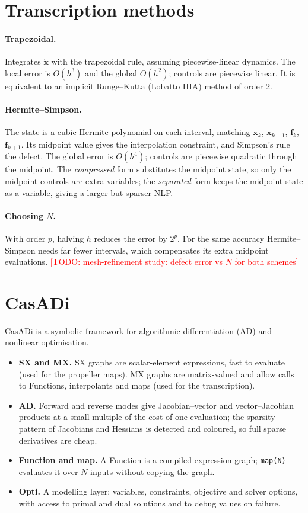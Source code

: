 \documentclass[11pt,a4paper]{article}
\newcommand{\todo}[1]{\textcolor{red}{[TODO: #1]}}
\newcommand{\code}[1]{\texttt{\small #1}}
\begin{document}
\section{Transcription methods}\label{app:transcription}
\paragraph{Trapezoidal.} Integrates $\dot{\mathbf{x}}$ with the trapezoidal rule, assuming piecewise-linear
dynamics. The local error is $O(h^3)$ and the global $O(h^2)$; controls are piecewise linear. It is
equivalent to an implicit Runge--Kutta (Lobatto IIIA) method of order 2.

\paragraph{Hermite--Simpson.} The state is a cubic Hermite polynomial on each interval, matching
$\mathbf{x}_k$, $\mathbf{x}_{k+1}$, $\mathbf{f}_k$, $\mathbf{f}_{k+1}$. Its midpoint value gives the
interpolation constraint, and Simpson's rule the defect. The global error is $O(h^4)$; controls are
piecewise quadratic through the midpoint. The \emph{compressed} form substitutes the midpoint state,
so only the midpoint controls are extra variables; the \emph{separated} form keeps the midpoint state
as a variable, giving a larger but sparser NLP.

\paragraph{Choosing $N$.} With order $p$, halving $h$ reduces the error by $2^p$. For the same accuracy
Hermite--Simpson needs far fewer intervals, which compensates its extra midpoint evaluations.
\todo{mesh-refinement study: defect error vs $N$ for both schemes}

\section{CasADi}\label{app:casadi}
CasADi is a symbolic framework for algorithmic differentiation (AD) and nonlinear optimisation.
\begin{itemize}
  \item \textbf{SX and MX.} SX graphs are scalar-element expressions, fast to evaluate (used for the
        propeller maps). MX graphs are matrix-valued and allow calls to Functions, interpolants and maps
        (used for the transcription).
  \item \textbf{AD.} Forward and reverse modes give Jacobian--vector and vector--Jacobian products at a small
        multiple of the cost of one evaluation; the sparsity pattern of Jacobians and Hessians is detected
        and coloured, so full sparse derivatives are cheap.
  \item \textbf{Function and map.} A Function is a compiled expression graph; \code{map(N)} evaluates it over
        $N$ inputs without copying the graph.
  \item \textbf{Opti.} A modelling layer: variables, constraints, objective and solver options, with access to
        primal and dual solutions and to debug values on failure.
\end{itemize}
\end{document}
